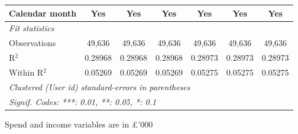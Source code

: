 \begin{table}[htbp]
\begin{threeparttable}[b]
\begin{tabular}{lcccccc}
         Calendar month      & Yes            & Yes            & Yes            & Yes            & Yes            & Yes\\  
         \midrule
         \emph{Fit statistics}\\
         Observations        & 49,636         & 49,636         & 49,636         & 49,636         & 49,636         & 49,636\\  
         R$^2$               & 0.28968        & 0.28968        & 0.28968        & 0.28973        & 0.28973        & 0.28973\\  
         Within R$^2$        & 0.05269        & 0.05269        & 0.05269        & 0.05275        & 0.05275        & 0.05275\\  
         \midrule \midrule
         \multicolumn{7}{l}{\emph{Clustered (User id) standard-errors in parentheses}}\\
         \multicolumn{7}{l}{\emph{Signif. Codes: ***: 0.01, **: 0.05, *: 0.1}}\\
      \end{tabular}
      
      \begin{tablenotes}\footnotesize
         \item Spend and income variables are in £'000
      \end{tablenotes}
   \end{threeparttable}
\end{table}


